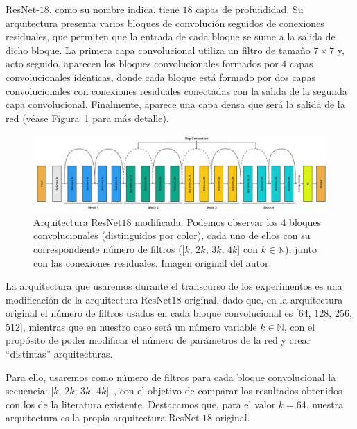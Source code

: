ResNet-$18$, como su nombre indica, tiene $18$ capas de profundidad. Su arquitectura presenta varios bloques de convolución seguidos de conexiones residuales, que permiten que la entrada de cada bloque se sume a la salida de dicho bloque. La primera capa convolucional utiliza un filtro de tamaño $7 \times 7$ y, acto seguido, aparecen los bloques convolucionales formados por $4$ capas convolucionales idénticas, donde cada bloque está formado por dos capas convolucionales con conexiones residuales conectadas con la salida de la segunda capa convolucional. Finalmente, aparece una capa densa que será la salida de la red (véase Figura~\ref{fig:resnet18} para más detalle).\newline

\begin{figure}[h]
    \centering
    \includegraphics[width=\linewidth]{img/experiments/resnet18modified.png}
    \caption[Arquitectura ResNet$18$ modificada.]{Arquitectura ResNet$18$ modificada. Podemos observar los 4 bloques convolucionales (distinguidos por color), cada uno de ellos con su correspondiente número de filtros ([$k$, $2k$, $3k$, $4k$] con $k \in \mathbb{N}$), junto con las conexiones residuales. Imagen original del autor.}\label{fig:resnet18}
\end{figure}

La arquitectura que usaremos durante el transcurso de los experimentos es una modificación de la arquitectura ResNet$18$ original, dado que, en la arquitectura original el número de filtros usados en cada bloque convolucional es [$64$, $128$, $256$, $512$], mientras que en nuestro caso será un número variable $k \in \mathbb{N}$, con el propósito de poder modificar el número de parámetros de la red y crear ``distintas'' arquitecturas.\newline

Para ello, usaremos como número de filtros para cada bloque convolucional la secuencia: [$k$, $2k$, $3k$, $4k$]~\cite{Nakkiran2019}, con el objetivo de comparar los resultados obtenidos con los de la literatura existente. Destacamos que, para el valor $k=64$, nuestra arquitectura es la propia arquitectura ResNet-$18$ original.\newline

